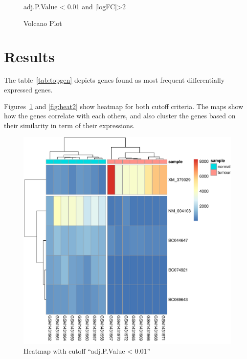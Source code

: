 \documentclass[12pt, ]{article}
\begin{document}
\begin{figure}[!htbp]
\begin{minipage}{.48\textwidth}
\scriptsize\centerline{adj.P.Value < 0.01 and |logFC|>2}
\end{minipage}
\caption{Volcano Plot}
\end{figure}

\section{Results}
The table~\ref{tab:topgen} depicts genes found as most frequent differentially expressed genes.

    Figures~\ref{fig:heat1} and \ref{fig:heat2} show heatmap for both cutoff criteria.
    The maps show how the genes correlate with each others, and also cluster the genes based on their similarity in term of their expressions. 

\begin{figure}[!htbp]
    \includegraphics[width=\textwidth,]{heatmap-adj.pdf}
    \caption{Heatmap with cutoff ``adj.P.Value < 0.01''}
    \label{fig:heat1}
\end{figure}
\end{document}
